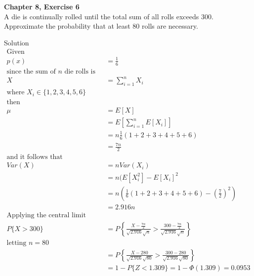 \documentclass{article}
\begin{document}
\begin{spacing}{1.1}
\newpage
\begin{homeworkProblem}
  {\bf Chapter 8, Exercise 6}\\
  A die is continually rolled until the total sum of all rolls 
  exceeds 300. Approximate the probability that at least 80 rolls 
  are necessary.
  \begin{homeworkSection}{Solution}
    \begin{align*}
      \text{Given}\\
      p(x) &= \frac{ 1}{ 6}\\
      \text{since the sum of $n$ die rolls is}\\
      X &= \sum\limits_{i = 1}^n X_i\\
      \text{where $X_i \in \{1,2,3,4,5,6\}$}\\
      \text{then}\\
      \mu &= E[ X] \\
        &= E\left[ \sum\limits_{i = 1}^n E[ X_i]\right] \\
        &= n \frac{ 1}{ 6} (1 + 2 + 3 + 4 + 5 + 6)\\
        &= \frac{ 7n}{ 2}\\
      \text{and it follows that}\\
      Var( X) &= n Var(X_i) \\
        &= n (E[X_i^2] - E[X_i]^2\\
        &= n \left(\frac{ 1}{ 6} (1 + 2 + 3 + 4 + 5 + 6) - \left(\frac{ 7}{ 2}\right)^2\right)\\
        &= 2.916 n\\
      \text{Applying the central limit theorm to our desired probability}\\
      P\{ X > 300\} 
        &= P\left\{ \frac{ X - \frac{ 7 n}{ 2}}{ \sqrt{ 2.916} \sqrt{ n}} 
          > \frac{ 300 - \frac{ 7 n}{ 2}}{ \sqrt{2.916} \sqrt{ n}}\right\}\\
      \text{letting $n = 80$}\\
        &= P\left\{ \frac{ X - 280}{ \sqrt{ 2.916} \sqrt{ 80}} 
          > \frac{ 300 - 280}{ \sqrt{2.916} \sqrt{ 80}}\right\}\\
        &= 1 - P\{Z < 1.309\} = 1 - \Phi(1.309) = 0.0953
    \end{align*}
  \end{homeworkSection}
\end{homeworkProblem}


\end{spacing}
\end{document}
